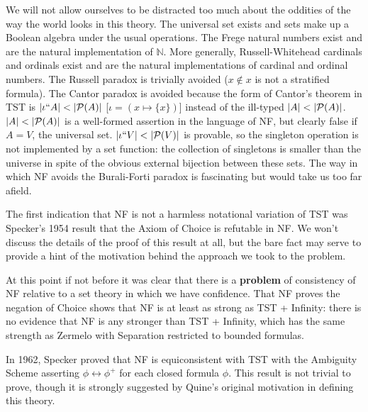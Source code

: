\documentclass{slides}
\begin{document}
\begin{slide}

We will not allow ourselves to be distracted too much about the oddities of the way the world looks in this theory.  The universal set exists and sets make up a Boolean algebra under the usual operations.  The Frege natural numbers exist and are the natural implementation of $\mathbb N$.  More generally, Russell-Whitehead cardinals and ordinals exist and are the natural implementations of cardinal and ordinal numbers.  The Russell paradox is trivially avoided ($x \not\in x$ is not a stratified formula).  The Cantor paradox is avoided because the form of Cantor's theorem in TST is $|\iota``A| < |{\cal P}(A)|$ [$\iota = (x \mapsto \{x\})$]  instead of the ill-typed $|A| < |{\cal P}(A)|$.  $|A| < |{\cal P}(A)|$ is a well-formed assertion in the language of NF, but clearly false if $A=V$, the universal set.  $|\iota``V| < |{\cal P}(V)|$  is provable, so the singleton operation is not implemented by a set function:  the collection of singletons is smaller than the universe in spite of the obvious external bijection between these sets.  The way in which NF avoids the Burali-Forti paradox is fascinating but would take us too far afield.

\end{slide}

\begin{slide}

The first indication that NF is not a harmless notational variation of TST was Specker's 1954 result that the Axiom of Choice is refutable in NF.  We won't discuss the details of the proof of this result at all, but the bare fact may serve to provide a hint of the motivation behind the approach we took to the problem.

At this point if not before it was clear that there is a {\bf problem} of consistency of NF relative to a set theory in which we have confidence.  That NF proves the negation of Choice shows
that NF is at least as strong as TST + Infinity:  there is no evidence that NF is any stronger than TST + Infinity, which has the same strength as Zermelo with Separation restricted to bounded formulas.

\end{slide}

\begin{slide}

In 1962, Specker proved that NF is equiconsistent with TST with the Ambiguity Scheme asserting $\phi \leftrightarrow \phi^+$ for each closed formula $\phi$.  This result is not trivial to prove, though it is strongly suggested by Quine's original motivation in defining this theory.

\end{slide}
\end{document}
